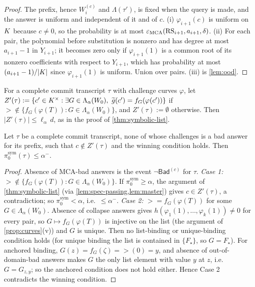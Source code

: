 \begin{proof}
The prefix, hence $W_i^{(c)}$ and $\Lambda(\tau')$, is fixed when the query is made, and the
answer is uniform and independent of it and of $c$. (i) $\varphi_{i+1}(c)$ is uniform on $K$
because $c\ne0$, so the probability is at most $\varepsilon_{\mathrm{MCA}}(\mathrm{RS}_{i+1},a_{i+1},\delta)$.
(ii) For each pair, the polynomial before substitution is nonzero and has degree at most
$a_{i+1}-1$ in $Y_{i+1}$; it becomes zero only if $\varphi_{i+1}(1)$ is a common root of its
nonzero coefficients with respect to $Y_{i+1}$, which has probability at most
$(a_{i+1}-1)/|K|$ since $\varphi_{i+1}(1)$ is uniform. Union over pairs. (iii) is
\cref{lem:ood}.
\end{proof}

\begin{definition}\label{def:zprime}
For a complete commit transcript $\tau$ with challenge curves $\varphi$, let
$Z'(\tau):=\{c'\in K^\times:\exists G\in\Lambda_\alpha(W_0),\ \widetilde g(c')=f_G(\varphi(c'))\}$ if
$\gt\notin\{f_G(\varphi(T)):G\in\Lambda_\alpha(W_0)\}$, and $Z'(\tau):=\emptyset$ otherwise.
Then $|Z'(\tau)|\le\ell_\alpha\,d$, as in the proof of \cref{thm:symbolic-list}.
\end{definition}

\begin{lemma}\label{lem:no-bad}
Let $\tau$ be a complete commit transcript, none of whose challenges is a bad answer for its
prefix, such that $c\notin Z'(\tau)$ and the winning condition holds. Then
$\pi^{\mathrm{sym}}_0(\tau)\le\alpha^-$.
\end{lemma}

\begin{proof}
Absence of MCA-bad answers is the event $\neg\mathsf{Bad}^{(c)}$ for $\tau$.
\emph{Case 1:} $\gt\notin\{f_G(\varphi(T)):G\in\Lambda_\alpha(W_0)\}$. If
$\pi^{\mathrm{sym}}_0\ge\alpha$, the argument of \cref{thm:symbolic-list} (via
\cref{lem:spec-passing,lem:master}) gives $c\in Z'(\tau)$, a contradiction; so
$\pi^{\mathrm{sym}}_0<\alpha$, i.e.\ $\le\alpha^-$.
\emph{Case 2:} $\gt=f_G(\varphi(T))$ for some $G\in\Lambda_\alpha(W_0)$. Absence of collapse
answers gives $h(\varphi_1(1),\dots,\varphi_k(1))\ne0$ for every pair, so
$G\mapsto f_G(\varphi(T))$ is injective on the list (the argument of
\cref{prop:curves}(v)) and $G$ is unique. Then no list-binding or unique-binding
condition holds (for unique binding the list is contained in $\{F_\star\}$, so $G=F_\star$).
For anchored binding, $G(z)=f_G(\zeta)=\gt(0)=y$, and absence of out-of-domain-bad answers
makes $G$ the only list element with value $y$ at $z$, i.e.\ $G=G_{z,y}$; so the
anchored condition does not hold either. Hence Case 2 contradicts the winning condition.
\end{proof}

